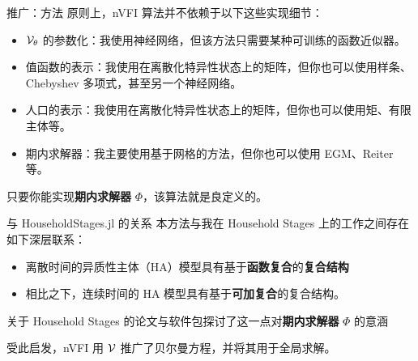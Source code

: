 \documentclass[10pt,aspectratio=169]{beamer}
\begin{document}
\begin{frame}{推广：方法}
  原则上，nVFI 算法并不依赖于以下这些实现细节：
  \begin{itemize}
    \item $\mathcal{V}_\theta$ 的参数化：我使用神经网络，但该方法只需要某种可训练的函数近似器。
    \item 值函数的表示：我使用在离散化特异性状态上的矩阵，但你也可以使用样条、Chebyshev 多项式，甚至另一个神经网络。
    \item 人口的表示：我使用在离散化特异性状态上的矩阵，但你也可以使用矩、有限主体等。
    \item 期内求解器：我主要使用基于网格的方法，但你也可以使用 EGM、Reiter 等。
  \end{itemize}
  只要你能实现\textbf{期内求解器} $\Phi$，该算法就是良定义的。
\end{frame}

\begin{frame}{与 HouseholdStages.jl 的关系}
  本方法与我在 Household Stages 上的工作之间存在如下深层联系：
  \begin{itemize}
    \item 离散时间的异质性主体（HA）模型具有基于\textbf{函数复合}的\textbf{复合结构}
    \item 相比之下，连续时间的 HA 模型具有基于\textbf{可加复合}的复合结构。
  \end{itemize}
  关于 Household Stages 的论文与软件包探讨了这一点对\textbf{期内求解器} $\Phi$ 的意涵

  受此启发，nVFI 用 $\mathcal{V}$ 推广了贝尔曼方程，并将其用于全局求解。
\end{frame}
\end{document}
